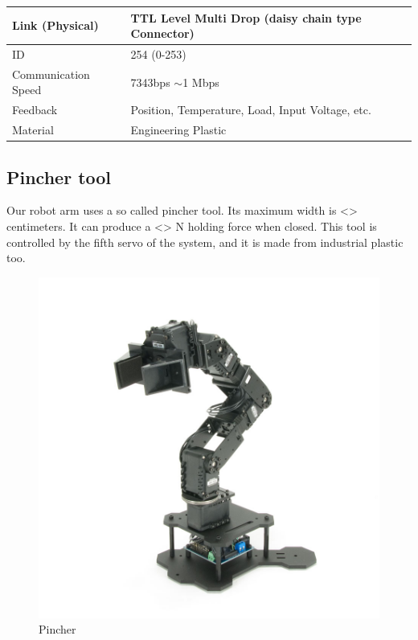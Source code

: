 \begin{table}[ht]
\begin{tabular}{|l|l|}
					Link (Physical)      & TTL Level Multi Drop (daisy chain type Connector)                                                              \\ \hline
					ID                   & 254 (0-253)                                                                                                    \\ \hline
					Communication Speed  & 7343bps $\sim$1 Mbps                                                                                           \\ \hline
					Feedback						 & Position, Temperature, Load, Input Voltage, etc.																																\\ \hline
					Material						 & Engineering Plastic																																														\\ \hline
				\end{tabular}
			\end{table}

		\subsection{Pincher tool}
	
			\hspace{15pt}Our robot arm uses a so called pincher tool. Its maximum width is <> centimeters. It can produce a <> N holding force when closed. This tool is controlled by the fifth servo of the system, and it is made from industrial plastic too. \cite{robot_servo} \cite{pincher}
		
				\begin{figure}[ht]
					\centering
					\includegraphics[scale=0.33]{./images/pincher}
					\caption{Pincher \cite{pincher}}
				\end{figure}
	
